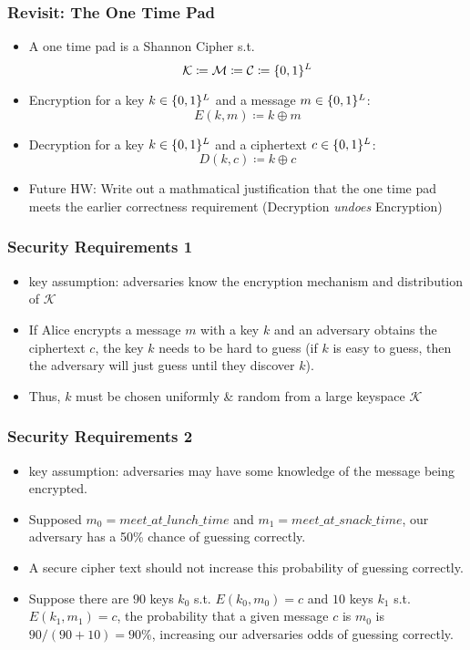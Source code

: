 \documentclass{beamer}
\begin{document}
\begin{frame}
\frametitle{Revisit: The One Time Pad}
\begin{itemize}
    \item A one time pad is a Shannon Cipher s.t. \[\mathcal{K} \coloneqq \mathcal{M} \coloneqq \mathcal{C} \coloneqq \{0, 1\}^{\mathnormal{L}} \]\pause
    \item Encryption for a key \(k \in \{0,1\}^{\mathnormal{L}}\) and a message \(m \in \{0,1\}^{\mathnormal{L}}\):\[E(k, m) \coloneqq k \oplus m \]\pause
    \item Decryption for a key \(k \in \{0,1\}^{\mathnormal{L}}\) and a ciphertext \(c \in \{0,1\}^{\mathnormal{L}}\):\[D(k, c) \coloneqq k \oplus c \]\pause
    \item Future HW: Write out a mathmatical justification that the one time pad meets the earlier correctness requirement (Decryption \textit{undoes} Encryption)
\end{itemize}
\end{frame}

\begin{frame}
\frametitle{Security Requirements 1}
\begin{itemize}
    \item key assumption: adversaries know the encryption mechanism and distribution of \(\mathcal{K}\)\pause
    \item If Alice encrypts a message \(m\) with a key \(k\) and an adversary obtains the ciphertext \(c\), the key \(k\) needs to be hard to guess \pause (if \(k\) is easy to guess, then the adversary will just guess until they discover \(k\)). \pause
    \item Thus, \(k\) must be chosen uniformly \& random from a large keyspace \(\mathcal{K}\) 
\end{itemize}
\end{frame}

\begin{frame}
\frametitle{Security Requirements 2}
\begin{itemize}
    \item key assumption: adversaries may have some knowledge of the message being encrypted. \pause
    \item Supposed \(m_0 = meet\_at\_lunch\_time\) and \(m_1 = meet\_at\_snack\_time\), \pause our adversary has a 50\% chance of guessing correctly. \pause
    \item A secure cipher text should not increase this probability of guessing correctly. \pause
    \item Suppose there are \(90\) keys \(k_0\) s.t. \(E(k_0, m_0) = c\) and \(10\) keys \(k_1\) s.t. \(E(k_1, m_1) = c\), \pause the probability that a given message \(c\) is \(m_0\) is \(90 / (90 + 10) = 90\%\), increasing our adversaries odds of guessing correctly.
\end{itemize}
\end{frame}
\end{document}
